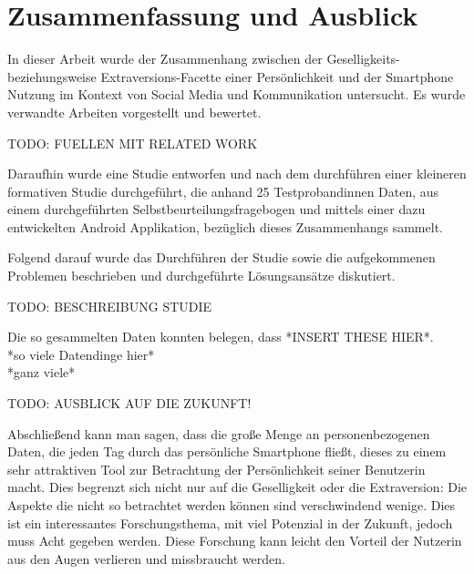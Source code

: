 
\chapter{Zusammenfassung und Ausblick}
\label{ch:Zusammenfassung}


In dieser Arbeit wurde der Zusammenhang zwischen der Geselligkeits- beziehungsweise Extraversions-Facette
einer Persönlichkeit und der Smartphone Nutzung im Kontext von Social Media und Kommunikation untersucht.
Es wurde verwandte Arbeiten vorgestellt und bewertet.
\par
TODO: FUELLEN MIT RELATED WORK
\par
Daraufhin wurde eine Studie entworfen und nach dem durchführen einer kleineren formativen Studie durchgeführt, die anhand 25 Testprobandinnen Daten, aus einem durchgeführten Selbstbeurteilungsfragebogen und
 mittels einer dazu entwickelten Android Applikation, bezüglich dieses Zusammenhangs sammelt.

Folgend darauf wurde das Durchführen der Studie sowie die aufgekommenen Problemen beschrieben und durchgeführte Lösungsansätze diskutiert.
\par
TODO: BESCHREIBUNG STUDIE
\par
Die so gesammelten Daten konnten belegen, dass *INSERT THESE HIER*.\\
*so viele Datendinge hier*\\
*ganz viele*
\par
TODO: AUSBLICK AUF DIE ZUKUNFT!
\par
Abschließend kann man sagen, dass die große Menge an personenbezogenen Daten,
die jeden Tag durch das persönliche Smartphone fließt, dieses zu einem sehr attraktiven Tool zur Betrachtung der Persönlichkeit seiner Benutzerin macht.
Dies begrenzt sich nicht nur auf die Geselligkeit oder die Extraversion: Die Aspekte die nicht so betrachtet werden können sind verschwindend wenige.
Dies ist ein interessantes Forschungsthema, mit viel Potenzial in der Zukunft, jedoch muss Acht gegeben werden.
Diese Forschung kann leicht den Vorteil der Nutzerin aus den Augen verlieren und missbraucht werden. 


